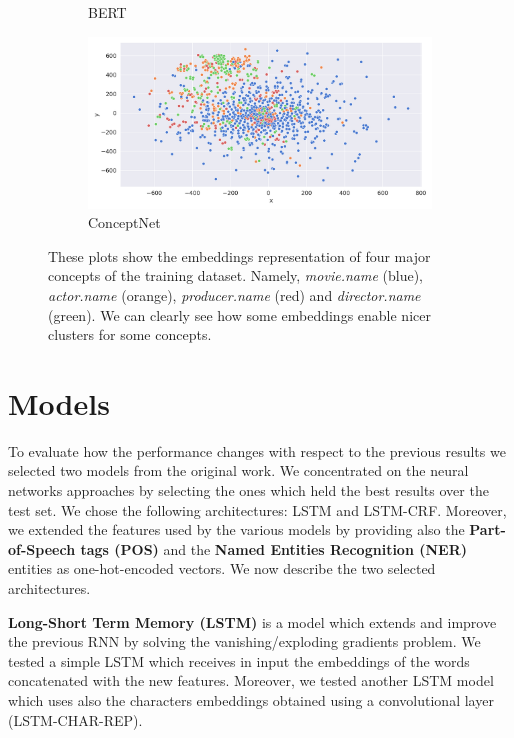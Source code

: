 \documentclass[11pt,a4paper]{article}
\begin{document}
\begin{figure}[t]
\begin{subfigure}{0.5\linewidth}
  \caption{BERT}
  \label{fig:sfig2}
\end{subfigure}%
\begin{subfigure}{0.5\linewidth}
  \centering
  \includegraphics[width=\linewidth]{img/conceptnet-embeddings.png}
  \caption{ConceptNet}
  \label{fig:sfig2}
\end{subfigure}
\caption{These plots show the embeddings representation of four major concepts of the training dataset. Namely, \textit{movie.name} (blue), \textit{actor.name} (orange), \textit{producer.name} (red) and \textit{director.name} (green). We can clearly see how some embeddings enable nicer clusters for some concepts. 
}
\label{fig:fig-emb}
\end{figure}

\section{Models}

To evaluate how the performance changes with respect 
to the previous results we selected two models from 
the original work. We concentrated on the neural 
networks approaches by selecting the ones which held 
the best results over the test set. We chose the 
following architectures: LSTM and LSTM-CRF.  
Moreover, we extended the features used by the 
various models by providing also the \textbf{Part-of-Speech 
tags (POS)} and the \textbf{Named Entities Recognition (NER)} 
entities as one-hot-encoded vectors. We now describe the two selected architectures.

\textbf{Long-Short Term Memory (LSTM)} \cite{lstm} is a model 
which extends and improve the previous RNN by 
solving the vanishing/exploding gradients problem. 
We tested a simple LSTM which receives in input the 
embeddings of the words concatenated with the new 
features. Moreover, we tested another LSTM model 
which uses also the characters embeddings obtained 
using a convolutional layer (LSTM-CHAR-REP). 
\end{document}
